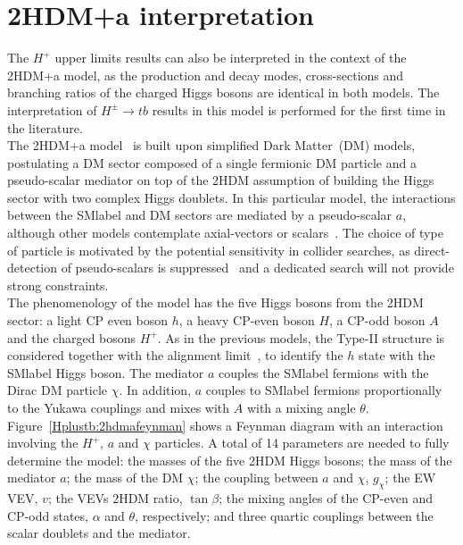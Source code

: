 \section{2HDM+a interpretation}

The $H^+$ upper limits results can also be interpreted in the context of the 2HDM+a model, as the production and decay modes, cross-sections and branching ratios of the charged Higgs bosons are identical in both models. The interpretation of $H^\pm\to tb$ results in this model is performed for the first time in the literature.\\

The 2HDM+a model~\cite{Bauer_2017,10.48550/arxiv.1810.09420} is built upon simplified Dark Matter~(DM) models, postulating a DM sector composed of a single fermionic DM particle and a pseudo-scalar mediator on top of the 2HDM assumption of building the Higgs sector with two complex Higgs doublets. In this particular model, the interactions between the \acrshort{SMlabel} and DM sectors are mediated by a pseudo-scalar $a$, although other models contemplate axial-vectors or scalars~\cite{Abercrombie_2020,10.48550/arxiv.1603.04156,10.48550/arxiv.1703.05703}. The choice of type of particle is motivated by the potential sensitivity in collider searches, as direct-detection of pseudo-scalars is suppressed~\cite{Abe_2019} and a dedicated search will not provide strong constraints.\\

The phenomenology of the model has the five Higgs bosons from the 2HDM sector: a light CP even boson $h$, a heavy CP-even boson $H$, a CP-odd boson $A$ and the charged bosons $H^+$. As in the previous models, the Type-II structure is considered together with the alignment limit~\cite{Gunion_2003}, to identify the $h$ state with the \acrshort{SMlabel} Higgs boson. The mediator $a$ couples the \acrshort{SMlabel} fermions with the Dirac DM particle $\chi$. In addition, $a$ couples to \acrshort{SMlabel} fermions proportionally to the Yukawa couplings and mixes with $A$ with a mixing angle $\theta$. Figure~\ref{Hplustb:2hdmafeynman} shows a Feynman diagram with an interaction involving the $H^+$, $a$ and $\chi$ particles. A total of 14 parameters are needed to fully determine the model: the masses of the five 2HDM Higgs bosons; the mass of the mediator $a$; the mass of the DM $\chi$; the coupling between $a$ and $\chi$, $g_\chi$; the \acrshort{EW} \acrshort{VEV}, $v$; the \acrshort{VEV}s 2HDM ratio, $\tan\beta$; the mixing angles of the CP-even and CP-odd states, $\alpha$ and $\theta$, respectively; and three quartic couplings between the scalar doublets and the mediator.\\

